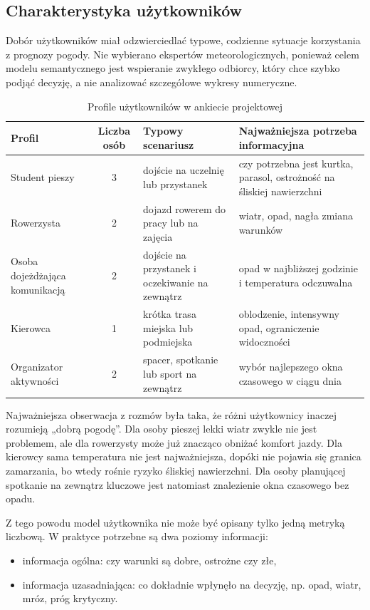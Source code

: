 \documentclass[a4paper,12pt]{article}
\begin{document}
\subsection{Charakterystyka użytkowników}

Dobór użytkowników miał odzwierciedlać typowe, codzienne sytuacje korzystania z
prognozy pogody. Nie wybierano ekspertów meteorologicznych, ponieważ celem
modelu semantycznego jest wspieranie zwykłego odbiorcy, który chce szybko
podjąć decyzję, a nie analizować szczegółowe wykresy numeryczne.

\begin{table}[h]
\centering
\caption{Profile użytkowników w ankiecie projektowej}
\small
\begin{tabularx}{\textwidth}{p{3.2cm}cp{4.2cm}X}
\toprule
Profil & Liczba osób & Typowy scenariusz & Najważniejsza potrzeba informacyjna \\
\midrule
Student pieszy & 3 & dojście na uczelnię lub przystanek & czy potrzebna jest kurtka, parasol, ostrożność na śliskiej nawierzchni \\
Rowerzysta & 2 & dojazd rowerem do pracy lub na zajęcia & wiatr, opad, nagła zmiana warunków \\
Osoba dojeżdżająca komunikacją & 2 & dojście na przystanek i oczekiwanie na zewnątrz & opad w najbliższej godzinie i temperatura odczuwalna \\
Kierowca & 1 & krótka trasa miejska lub podmiejska & oblodzenie, intensywny opad, ograniczenie widoczności \\
Organizator aktywności & 2 & spacer, spotkanie lub sport na zewnątrz & wybór najlepszego okna czasowego w ciągu dnia \\
\bottomrule
\end{tabularx}
\normalsize
\end{table}

Najważniejsza obserwacja z rozmów była taka, że różni użytkownicy inaczej
rozumieją „dobrą pogodę”. Dla osoby pieszej lekki wiatr zwykle nie jest
problemem, ale dla rowerzysty może już znacząco obniżać komfort jazdy. Dla
kierowcy sama temperatura nie jest najważniejsza, dopóki nie pojawia się
granica zamarzania, bo wtedy rośnie ryzyko śliskiej nawierzchni. Dla osoby
planującej spotkanie na zewnątrz kluczowe jest natomiast znalezienie okna
czasowego bez opadu.

Z tego powodu model użytkownika nie może być opisany tylko jedną metryką
liczbową. W praktyce potrzebne są dwa poziomy informacji:
\begin{itemize}
    \item informacja ogólna: czy warunki są dobre, ostrożne czy złe,
    \item informacja uzasadniająca: co dokładnie wpłynęło na decyzję, np. opad, wiatr, mróz, próg krytyczny.
\end{itemize}
\end{document}
